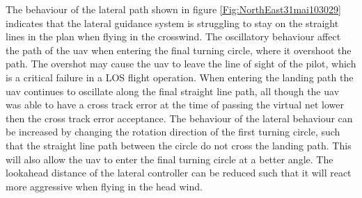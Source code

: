 The behaviour of the lateral path shown in figure \ref{Fig:NorthEast31mai103029} indicates that the lateral guidance system is struggling to stay on the straight lines in the plan when flying in the crosswind. The oscillatory behaviour affect the path of the \gls{uav} when entering the final turning circle, where it overshoot the path. The overshot may cause the \gls{uav} to leave the line of sight of the pilot, which is a critical failure in a LOS flight operation. When entering the landing path the \gls{uav} continues to oscillate along the final straight line path, all though the \gls{uav} was able to have a cross track error at the time of passing the virtual net lower then the cross track error acceptance. The behaviour of the lateral behaviour can be increased by changing the rotation direction of the first turning circle, such that the straight line path between the circle do not cross the landing path. This will also allow the \gls{uav} to enter the final  turning circle at a better angle. The lookahead distance of the lateral controller can be reduced such that it will react more aggressive when flying in the head wind.

